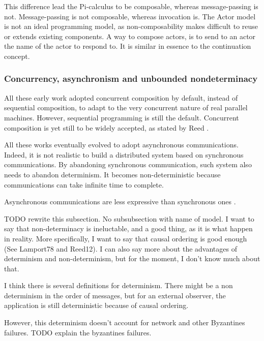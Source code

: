 This difference lead the Pi-calculus to be composable, whereas message-passing is not.
Message-passing is not composable, whereas invocation is.
The Actor model is not an ideal programming model, as non-composability makes difficult to reuse or extends existing components.
A way to compose actors, is to send to an actor the name of the actor to respond to.
It is similar in essence to the continuation concept.





\subsubsection{Concurrency, asynchronism and unbounded nondeterminacy}

All these early work adopted concurrent composition by default, instead of sequential composition, to adapt to the very concurrent nature of real parallel machines.
However, sequential programming is still the default.
Concurrent composition is yet still to be widely accepted, as stated by Reed \cite{Reed2012}.

All these works eventually evolved to adopt asynchronous communications.
Indeed, it is not realistic to build a distributed system based on synchronous communications. 
By abandoning synchronous communication, such system also needs to abandon determinism.
It becomes non-deterministic because communications can take infinite time to complete.

Asynchronous communications are less expressive than synchronous ones \cite{PALAMIDESSI2003}.



TODO rewrite this subsection.
No subsubsection with name of model.
I want to say that non-determinacy is ineluctable, and a good thing, as it is what happen in reality.
More specifically, I want to say that causal ordering is good enough (See Lamport78 and Reed12).
I can also say more about the advantages of determinism and non-determinism, but for the moment, I don't know much about that.

I think there is several definitions for determinism.
There might be a non determinism in the order of messages, but for an external observer, the application is still deterministic because of causal ordering.

However, this determinism doesn't account for network and other Byzantines failures.
TODO explain the byzantines failures.


